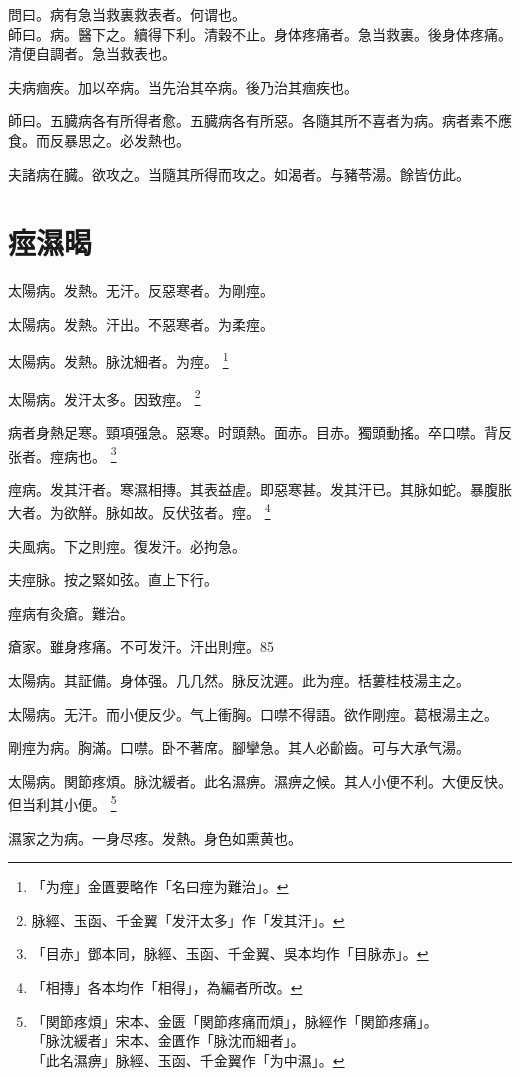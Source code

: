 \documentclass[12pt,twoside,UTF8,b5paper]{ctexbook}
\begin{document}
問曰。病有急当救裏救表者。何谓也。\\
師曰。病。醫下之。續得下利。清穀不止。身体疼痛者。急当救裏。後身体疼痛。清便自調者。急当救表也。

夫病痼疾。加以卒病。当先治其卒病。後乃治其痼疾也。

師曰。五臓病各有所得者愈。五臓病各有所惡。各隨其所不喜者为病。病者素不應食。而反暴思之。必发熱也。

夫諸病在臓。欲攻之。当隨其所得而攻之。如渴者。与豬苓湯。餘皆仿此。

\chapter{痙濕暍}

太陽病。发熱。无汗。反惡寒者。为剛痙。

太陽病。发熱。汗出。不惡寒者。为柔痙。

太陽病。发熱。脉沈細者。为痙。
	\footnote{「为痙」金匱要略作「名曰痙为難治」。}

太陽病。发汗太多。因致痙。
	\footnote{脉經、玉函、千金翼「发汗太多」作「发其汗」。}

病者身熱足寒。頸項强急。惡寒。时頭熱。面赤。目赤。獨頭動搖。卒口噤。背反张者。痙病也。
	\footnote{「目赤」鄧本同，脉經、玉函、千金翼、吳本均作「目脉赤」。}

痙病。发其汗者。寒濕相摶。其表益虗。即惡寒甚。发其汗已。其脉如蛇。暴腹胀大者。为欲觧。脉如故。反伏弦者。痙。
	\footnote{「相摶」各本均作「相得」，為編者所改。}

夫風病。下之則痙。復发汗。必拘急。

夫痙脉。按之緊如弦。直上下行。

痙病有灸瘡。難治。

瘡家。雖身疼痛。不可发汗。汗出則痙。85

太陽病。其証備。身体强。几几然。脉反沈遲。此为痙。栝蔞桂枝湯主之。

太陽病。无汗。而小便反少。气上衝胸。口噤不得語。欲作剛痙。葛根湯主之。

{剛}痙为病。胸滿。口噤。卧不著席。腳攣急。其人必齘齒。可与大承气湯。

太陽病。関節疼煩。脉沈緩者。此名濕痹。濕痹之候。其人小便不利。大便反快。但当利其小便。
	\footnote{「関節疼煩」宋本、金匮「関節疼痛而煩」，脉經作「関節疼痛」。\\「脉沈緩者」宋本、金匱作「脉沈而細者」。\\「此名濕痹」脉經、玉函、千金翼作「为中濕」。}

濕家之为病。一身尽疼。发熱。身色如熏黄也。
\end{document}

